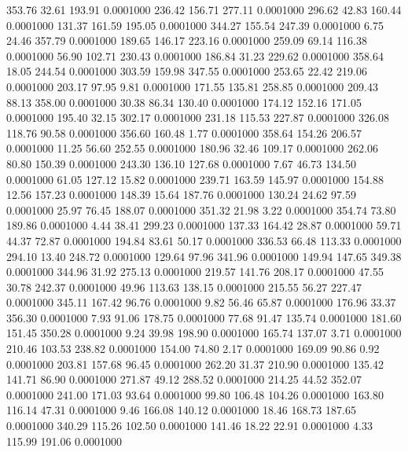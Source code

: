  353.76   32.61  193.91   0.0001000
 236.42  156.71  277.11   0.0001000
 296.62   42.83  160.44   0.0001000
 131.37  161.59  195.05   0.0001000
 344.27  155.54  247.39   0.0001000
   6.75   24.46  357.79   0.0001000
 189.65  146.17  223.16   0.0001000
 259.09   69.14  116.38   0.0001000
  56.90  102.71  230.43   0.0001000
 186.84   31.23  229.62   0.0001000
 358.64   18.05  244.54   0.0001000
 303.59  159.98  347.55   0.0001000
 253.65   22.42  219.06   0.0001000
 203.17   97.95    9.81   0.0001000
 171.55  135.81  258.85   0.0001000
 209.43   88.13  358.00   0.0001000
  30.38   86.34  130.40   0.0001000
 174.12  152.16  171.05   0.0001000
 195.40   32.15  302.17   0.0001000
 231.18  115.53  227.87   0.0001000
 326.08  118.76   90.58   0.0001000
 356.60  160.48    1.77   0.0001000
 358.64  154.26  206.57   0.0001000
  11.25   56.60  252.55   0.0001000
 180.96   32.46  109.17   0.0001000
 262.06   80.80  150.39   0.0001000
 243.30  136.10  127.68   0.0001000
   7.67   46.73  134.50   0.0001000
  61.05  127.12   15.82   0.0001000
 239.71  163.59  145.97   0.0001000
 154.88   12.56  157.23   0.0001000
 148.39   15.64  187.76   0.0001000
 130.24   24.62   97.59   0.0001000
  25.97   76.45  188.07   0.0001000
 351.32   21.98    3.22   0.0001000
 354.74   73.80  189.86   0.0001000
   4.44   38.41  299.23   0.0001000
 137.33  164.42   28.87   0.0001000
  59.71   44.37   72.87   0.0001000
 194.84   83.61   50.17   0.0001000
 336.53   66.48  113.33   0.0001000
 294.10   13.40  248.72   0.0001000
 129.64   97.96  341.96   0.0001000
 149.94  147.65  349.38   0.0001000
 344.96   31.92  275.13   0.0001000
 219.57  141.76  208.17   0.0001000
  47.55   30.78  242.37   0.0001000
  49.96  113.63  138.15   0.0001000
 215.55   56.27  227.47   0.0001000
 345.11  167.42   96.76   0.0001000
   9.82   56.46   65.87   0.0001000
 176.96   33.37  356.30   0.0001000
   7.93   91.06  178.75   0.0001000
  77.68   91.47  135.74   0.0001000
 181.60  151.45  350.28   0.0001000
   9.24   39.98  198.90   0.0001000
 165.74  137.07    3.71   0.0001000
 210.46  103.53  238.82   0.0001000
 154.00   74.80    2.17   0.0001000
 169.09   90.86    0.92   0.0001000
 203.81  157.68   96.45   0.0001000
 262.20   31.37  210.90   0.0001000
 135.42  141.71   86.90   0.0001000
 271.87   49.12  288.52   0.0001000
 214.25   44.52  352.07   0.0001000
 241.00  171.03   93.64   0.0001000
  99.80  106.48  104.26   0.0001000
 163.80  116.14   47.31   0.0001000
   9.46  166.08  140.12   0.0001000
  18.46  168.73  187.65   0.0001000
 340.29  115.26  102.50   0.0001000
 141.46   18.22   22.91   0.0001000
   4.33  115.99  191.06   0.0001000
